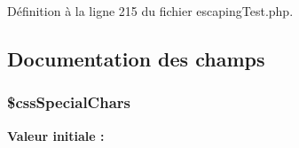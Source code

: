 Définition à la ligne 215 du fichier escaping\+Test.\+php.



\subsection{Documentation des champs}
\subsubsection[{\texorpdfstring{\$css\+Special\+Chars}{$cssSpecialChars}}]{\setlength{\rightskip}{0pt plus 5cm}\$css\+Special\+Chars\hspace{0.3cm}{\ttfamily [protected]}}\hypertarget{class_twig___test___escaping_test_a2f5088b5f610faf6297b6321ec566fa6}{}\label{class_twig___test___escaping_test_a2f5088b5f610faf6297b6321ec566fa6}
{\bfseries Valeur initiale \+:}
